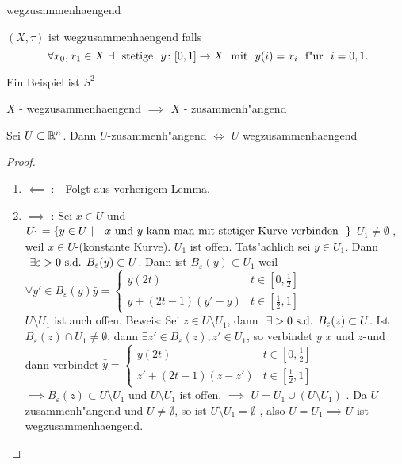 \documentclass[class=article, crop=false]{standalone}
\begin{document}
\begin{zettel}{wegzusammenhaengend}
\begin{flashcard}
    \begin{definition}
    $(X,\tau)$ ist wegzusammenhaengend falls 
\[
    \forall x_0,x_1 \in  X \exists \tx{ stetige } y \from [0,1] \to X \tx{ mit } y(i)=  x_i \tx{ f"ur } i =  0,1
.\]
    \end{definition}
\end{flashcard}
    \begin{example}
    Ein Beispiel ist $S^2$ 
    \end{example}
    \begin{lemma}
    $X$ - wegzusammenhaengend $\implies $ $X$ - zusammenh"angend
    \end{lemma}
    \begin{lemma}
   Sei $U \subset \mathbb{R}^n$. Dann $U$-zusammenh"angend $\iff $ $U$ wegzusammenhaengend
    \end{lemma}
    \begin{proof}
        \begin{enumerate}
            \item $\impliedby $ : - Folgt aus vorherigem Lemma.
            \item $\implies $ : Sei $x \in  U$-und $U_1 =\set{y \in  U}{\tx{ $x$-und $y$-kann man mit stetiger Kurve verbinden } }$ $U_1 \neq \emptyset $-, weil $x \in  U$-(konstante Kurve). $U_1$ ist offen. Tats"achlich sei $y \in  U_1$. Dann $\exists \varepsilon > 0 \tx{s.d.} B_{\varepsilon}(y) \subset  U$. Dann ist $B_{\varepsilon}(y) \subset  U_1$-weil $\forall y' \in  B_{\varepsilon}(y) \bar{y} = \begin{cases}
                    y (2t) & t \in  [0,\frac{1}{2}]\\
                    y + (2t-1)(y'-y) & t \in  [\frac{1}{2},1]
            \end{cases}$\\

            $U \setminus U_1$ ist auch offen. Beweis: Sei $z \in  U \setminus  U_1 $, dann $\exists >0 \tx{s.d.} B_{\varepsilon}(z) \subset  U$. Ist $B_{\varepsilon}(z) \cap  U_1 \neq  \emptyset $, dann $\exists  z' \in  B_{\varepsilon}(z), z' \in  U_1$, so verbindet $y$ $x$ und $z$-und dann verbindet $\bar{\bar{y}} = \begin{cases}
                y(2t) & t \in [0,\frac{1}{2}]\\
                z'+(2t-1)(z-z') & t \in  [\frac{1}{2}, 1]
            \end{cases}$\\
        
            $\implies B_{\varepsilon}(z) \subset U \setminus U_1$ und $U \setminus U_1$ ist offen. $\implies $ $U = U_1 \cup (U \setminus  U_1)$ . Da $U$ zusammenh"angend und $U \neq  \emptyset $, so ist $U \setminus U_1 = \emptyset $ , also $U = U_1 \implies U$ ist wegzusammenhaengend.

        \end{enumerate}
    \end{proof}
\end{zettel}
\end{document}
